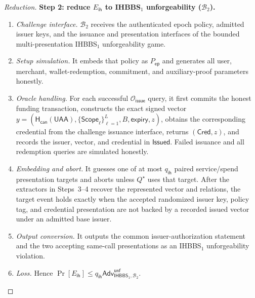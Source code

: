 \documentclass[letterpaper]{article}
\newcommand{\hash}{\mathsf{H}_{\mathsf{can}}}
\newcommand{\Adv}{\mathsf{Adv}}
\begin{document}
\begin{proof}[Reduction]
\textbf{Step 2: reduce \(E_{\mathsf{ih}}\) to IHBBS\(_1\)
unforgeability (\(\mathcal B_2\)).}
\begin{enumerate}
  \item \emph{Challenge interface.} \(\mathcal B_2\) receives the authenticated
  epoch policy, admitted issuer keys, and the issuance and presentation
  interfaces of the bounded multi-presentation IHBBS\(_1\) unforgeability game.
  \item \emph{Setup simulation.} It embeds that policy as
  \(P_{\mathsf{ep}}\) and generates all user, merchant, wallet-redemption,
  commitment, and auxiliary-proof parameters honestly.
  \item \emph{Oracle handling.} For each successful
  \(\mathcal O_{\mathsf{issue}}\) query, it first commits the honest funding
  transaction, constructs the exact signed vector
  \(y=(\hash(\mathsf{UAA}),\{\mathsf{Scope}_\ell\}_{\ell=1}^{L},
  B,\mathsf{expiry},z)\), obtains the corresponding credential from the
  challenge issuance interface, returns \((\mathsf{Cred},z)\), and records the
  issuer, vector, and credential in \(\mathsf{Issued}\). Failed issuance and all
  redemption queries are simulated honestly.
  \item \emph{Embedding and abort.} It guesses one of at most
  \(q_{\mathsf{ih}}\) paired service/spend presentation targets and aborts
  unless \(Q^\star\) uses that target. After the extractors in Steps~3--4
  recover the represented vector and relations, the target event holds exactly
  when the accepted randomized issuer key, policy tag, and credential
  presentation are not backed by a recorded issued vector under an admitted
  base issuer.
  \item \emph{Output conversion.} It outputs the common issuer-authorization
  statement and the two accepting same-call presentations as an IHBBS\(_1\)
  unforgeability violation.
  \item \emph{Loss.} Hence
  \(\Pr[E_{\mathsf{ih}}]\le
  q_{\mathsf{ih}}\Adv^{\mathsf{unf}}_{\mathsf{IHBBS}_1,\mathcal B_2}\).
\end{enumerate}


\end{proof}
\end{document}
